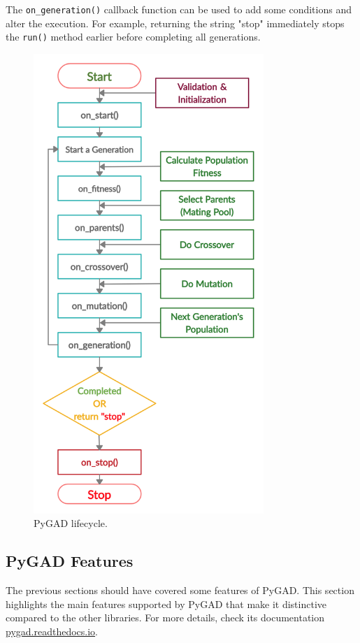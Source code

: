 \documentclass[conference]{IEEEtran}
\begin{document}
The \texttt{on\_generation()} callback function can be used to add some conditions and alter the execution. For example, returning the string "stop" immediately stops the \texttt{run()} method earlier before completing all generations.

\begin{figure}[t]
    \centering
    \includegraphics[width=8.7cm]{pygad_lifecycle}
    \caption{PyGAD lifecycle.}
    \label{fig:pygad_lifecycle}
\end{figure}

\subsection{PyGAD Features}
\label{pygadmainfeatures}

The previous sections should have covered some features of PyGAD. This section highlights the main features supported by PyGAD that make it distinctive compared to the other libraries. For more details, check its documentation \href{https://pygad.readthedocs.io}{pygad.readthedocs.io}.
\end{document}
